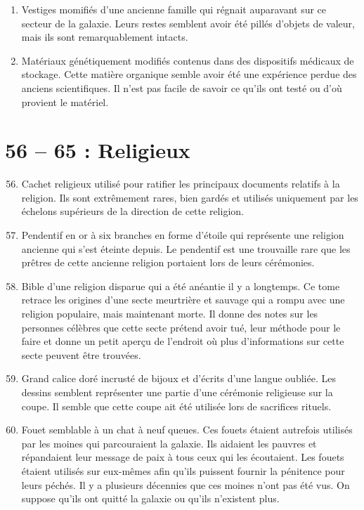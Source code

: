 \documentclass{article}
\begin{document}
\begin{enumerate}
	\item Vestiges momifiés d'une ancienne famille qui régnait auparavant sur ce secteur de la galaxie. Leurs restes semblent avoir été pillés d'objets de valeur, mais ils sont remarquablement intacts.
	\item Matériaux génétiquement modifiés contenus dans des dispositifs médicaux de stockage. Cette matière organique semble avoir été une expérience perdue des anciens scientifiques. Il n'est pas facile de savoir ce qu'ils ont testé ou d'où provient le matériel.
\end{enumerate}
\section*{56 -- 65 : Religieux}
\begin{enumerate}
	\setcounter{enumi}{55}
	\item Cachet religieux utilisé pour ratifier les principaux documents relatifs à la religion. Ils sont extrêmement rares, bien gardés et utilisés uniquement par les échelons supérieurs de la direction de cette religion.
	\item Pendentif en or à six branches en forme d'étoile qui représente une religion ancienne qui s'est éteinte depuis. Le pendentif est une trouvaille rare que les prêtres de cette ancienne religion portaient lors de leurs cérémonies.
	\item Bible d'une religion disparue qui a été anéantie il y a longtemps. Ce tome retrace les origines d'une secte meurtrière et sauvage qui a rompu avec une religion populaire, mais maintenant morte. Il donne des notes sur les personnes célèbres que cette secte prétend avoir tué, leur méthode pour le faire et donne un petit aperçu de l'endroit où plus d'informations sur cette secte peuvent être trouvées.
	\item Grand calice doré incrusté de bijoux et d'écrits d'une langue oubliée. Les dessins semblent représenter une partie d'une cérémonie religieuse sur la coupe. Il semble que cette coupe ait été utilisée lors de sacrifices rituels.
	\item Fouet semblable à un chat à neuf queues. Ces fouets étaient autrefois utilisés par les moines qui parcouraient la galaxie. Ils aidaient les pauvres et répandaient leur message de paix à tous ceux qui les écoutaient. Les fouets étaient utilisés sur eux-mêmes afin qu'ils puissent fournir la pénitence pour leurs péchés. Il y a plusieurs décennies que ces moines n'ont pas été vus. On suppose qu'ils ont quitté la galaxie ou qu'ils n'existent plus.

\end{enumerate}
\end{document}
